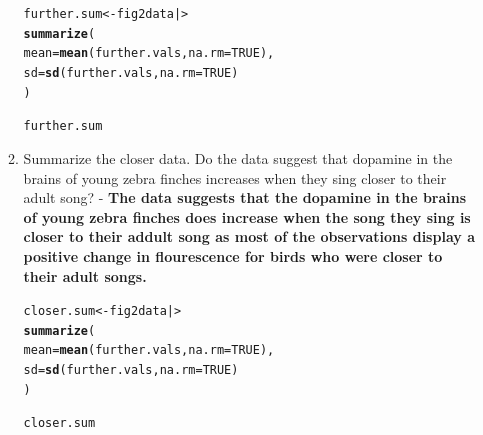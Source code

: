 \documentclass{article}\usepackage[]{graphicx}\usepackage[]{xcolor}
\makeatletter
\newcommand{\hlnum}[1]{\textcolor[rgb]{0.686,0.059,0.569}{#1}}%
\newcommand{\hldef}[1]{\textcolor[rgb]{0.345,0.345,0.345}{#1}}%
\newcommand{\hlkwb}[1]{\textcolor[rgb]{0.69,0.353,0.396}{#1}}%
\newcommand{\hlkwc}[1]{\textcolor[rgb]{0.333,0.667,0.333}{#1}}%
\newcommand{\hlkwd}[1]{\textcolor[rgb]{0.737,0.353,0.396}{\textbf{#1}}}%
\newenvironment{kframe}{%
 \def\at@end@of@kframe{}%
 \ifinner\ifhmode%
  \def\at@end@of@kframe{\end{minipage}}%
  \begin{minipage}{\columnwidth}%
 \fi\fi%
 \def\FrameCommand##1{\hskip\@totalleftmargin \hskip-\fboxsep
 \colorbox{shadecolor}{##1}\hskip-\fboxsep
     \hskip-\linewidth \hskip-\@totalleftmargin \hskip\columnwidth}%
 \MakeFramed {\advance\hsize-\width
   \@totalleftmargin\z@ \linewidth\hsize
   \@setminipage}}%
 {\par\unskip\endMakeFramed%
 \at@end@of@kframe}
\newenvironment{knitrout}{}{} %
\makeatother
\begin{document}
\begin{enumerate}
\begin{enumerate}
\begin{knitrout}
\begin{kframe}
{\ttfamily\noindent\bfseries\color{errorcolor}{\#\# Error in `mutate()`:\\\#\# i In argument: `difference = fig2data\$closer.vals -\\\#\# \ \ fig2data\$further.vals`.\\\#\# Caused by error:\\\#\# ! object 'fig2data' not found}}\begin{alltt}
\hldef{further.sum} \hlkwb{<-} \hldef{fig2data |>}
\hlkwd{summarize}\hldef{(}
  \hlkwc{mean} \hldef{=} \hlkwd{mean}\hldef{(further.vals,} \hlkwc{na.rm} \hldef{=} \hlnum{TRUE}\hldef{),}
  \hlkwc{sd} \hldef{=} \hlkwd{sd}\hldef{(further.vals,} \hlkwc{na.rm} \hldef{=} \hlnum{TRUE}\hldef{)}
\hldef{)}
\end{alltt}


{\ttfamily\noindent\bfseries\color{errorcolor}{\#\# Error: object 'fig2data' not found}}\begin{alltt}
\hldef{further.sum}
\end{alltt}


{\ttfamily\noindent\bfseries\color{errorcolor}{\#\# Error: object 'further.sum' not found}}\end{kframe}
\end{knitrout}
   \item Summarize the closer data. Do the data suggest that
   dopamine in the brains of young zebra finches increases when
   they sing closer to their adult song? - \textbf{The data suggests that the dopamine in the brains of young zebra finches does increase when the song they sing is closer to their addult song as most of the observations display a positive change in flourescence for birds who were closer to their adult songs.}
\begin{knitrout}\scriptsize
{}\color{fgcolor}\begin{kframe}
\begin{alltt}
\hldef{closer.sum} \hlkwb{<-} \hldef{fig2data |>}
  \hlkwd{summarize}\hldef{(}
 \hlkwc{mean} \hldef{=} \hlkwd{mean}\hldef{(further.vals,} \hlkwc{na.rm} \hldef{=} \hlnum{TRUE}\hldef{),}
 \hlkwc{sd} \hldef{=} \hlkwd{sd}\hldef{(further.vals,} \hlkwc{na.rm} \hldef{=} \hlnum{TRUE}\hldef{)}
  \hldef{)}
\end{alltt}


{\ttfamily\noindent\bfseries\color{errorcolor}{\#\# Error: object 'fig2data' not found}}\begin{alltt}
\hldef{closer.sum}
\end{alltt}



\end{kframe}
\end{knitrout}
\end{enumerate}
\end{enumerate}
\end{document}
